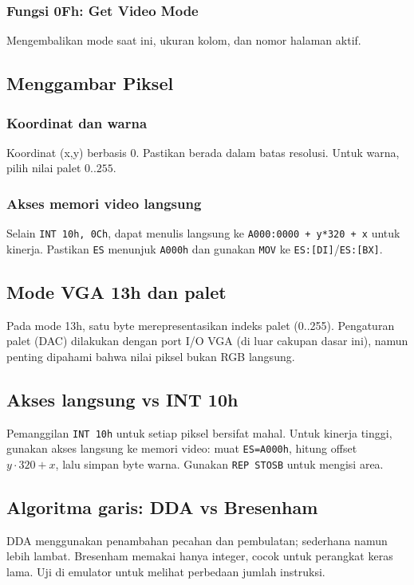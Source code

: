 \subsubsection{Fungsi 0Fh: Get Video Mode}
Mengembalikan mode saat ini, ukuran kolom, dan nomor halaman aktif.

\subsection{Menggambar Piksel}
\subsubsection{Koordinat dan warna}
Koordinat (x,y) berbasis 0. Pastikan berada dalam batas resolusi. Untuk warna, pilih nilai palet \(0..255\).

\subsubsection{Akses memori video langsung}
Selain \texttt{INT 10h, 0Ch}, dapat menulis langsung ke \texttt{A000:0000 + y*320 + x} untuk kinerja. Pastikan \texttt{ES} menunjuk \texttt{A000h} dan gunakan \texttt{MOV} ke \texttt{ES:[DI]}/\texttt{ES:[BX]}.

\subsection{Mode VGA 13h dan palet}
Pada mode 13h, satu byte merepresentasikan indeks palet (0..255). Pengaturan palet (DAC) dilakukan dengan port I/O VGA (di luar cakupan dasar ini), namun penting dipahami bahwa nilai piksel bukan RGB langsung. \cite{abrash_black_book}

\subsection{Akses langsung vs INT 10h}
Pemanggilan \texttt{INT 10h} untuk setiap piksel bersifat mahal. Untuk kinerja tinggi, gunakan akses langsung ke memori video: muat \texttt{ES=A000h}, hitung offset \(y\cdot 320 + x\), lalu simpan byte warna. Gunakan \texttt{REP STOSB} untuk mengisi area. \cite{abrash_black_book}

\subsection{Algoritma garis: DDA vs Bresenham}
DDA menggunakan penambahan pecahan dan pembulatan; sederhana namun lebih lambat. Bresenham memakai hanya integer, cocok untuk perangkat keras lama. Uji di emulator untuk melihat perbedaan jumlah instruksi. \cite{abrash_black_book}

